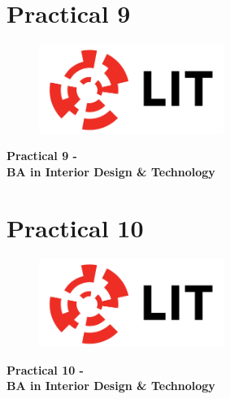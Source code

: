 \documentclass[a4paper, 10pt]{article}
\begin{document}
		

\newpage
\section{Practical 9}

\newpage
\setcounter{page}{1}
\begin{center}
	\begin{figure}[ht]
		\centering
		\includegraphics[width = 6cm]{img/LITlogo.jpg}
		\label{fig:logoa9}
	\end{figure}
	\Large\textbf{Practical 9 - }\\
	\large\textbf{BA in Interior Design \& Technology}
\end{center}
		
\newpage	
\section{Practical 10}

\newpage
\setcounter{page}{1}
\begin{center}
	\begin{figure}[ht]
		\centering
		\includegraphics[width = 6cm]{img/LITlogo.jpg}
		\label{fig:logoa10}
	\end{figure}
	\Large\textbf{Practical 10 - }\\
	\large\textbf{BA in Interior Design \& Technology}
\end{center}		
		
		
\end{document}
